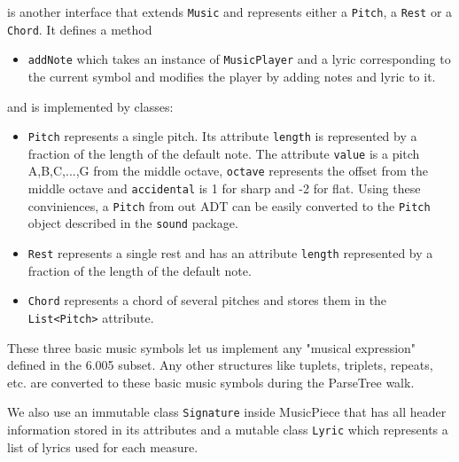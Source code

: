 \documentclass[12pt]{book}
\begin{document}
\bigskip

 is another interface that extends {\tt Music} and represents either a {\tt Pitch}, a {\tt Rest} or a {\tt Chord}. It defines a method
\begin{itemize} 
\item { \tt addNote} which takes an instance of  {\tt MusicPlayer} and a lyric corresponding to the current symbol and modifies the player by adding notes and lyric to it. 
\end{itemize}
\noindent and is implemented by classes:
\begin{itemize} 
\item { \tt Pitch} represents a single pitch. Its attribute {\tt length} is represented by a fraction  of the length of the default note. The attribute {\tt value} is a pitch A,B,C,...,G from the middle octave,  {\tt octave} represents the offset from the middle octave and  {\tt accidental} is 1 for sharp and -2 for flat. Using these conviniences,  a {\tt Pitch} from out ADT can be easily converted to the {\tt Pitch} object described in the {\tt sound} package.
\item { \tt Rest} represents a single rest and has an attribute {\tt length}  represented by a fraction of the length of the default note. 
\item {\tt Chord} represents a chord of several pitches and stores them in the {\tt List<Pitch>} attribute.
\end{itemize}

These three basic music symbols let us implement any "musical expression" defined in the 6.005 subset. Any other structures like tuplets, triplets, repeats, etc. are converted to these basic music symbols during the ParseTree walk.  

We also use an immutable class {\tt Signature} inside MusicPiece that has all header information stored in its attributes and a mutable class {\tt Lyric} which represents a list of lyrics used for each measure.
\end{document}
